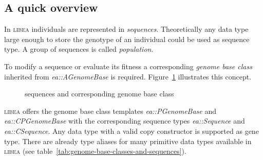 \documentclass[a4paper]{article}
\begin{document}
\subsection{A quick overview}

In \textsc{libea} individuals are represented in \textit{sequences}. Theoretically any data type large enough to store the genotype of an individual could be used as sequence type. A group of sequences is called \textit{population}.

To modify a sequence or evaluate its fitness a corresponding \textit{genome base class} inherited from \textit{ea::AGenomeBase} is required. Figure~\ref{fig:overview} illustrates this concept.

\begin{figure}[h]
\caption{sequences and corresponding genome base class}
\label{fig:overview}
{

}
\end{figure}

\textsc{libea} offers the genome base class templates \textit{ea::PGenomeBase} and \textit{ea::CPGenomeBase} with the corresponding sequence types \textit{ea::Sequence} and \textit{ea::CSequence}. Any data type with a valid copy constructor is supported as gene type. There are already type aliases for many primitive data types available in \textsc{libea} (see table~\ref{tab:genome-base-classes-and-sequences}).
\end{document}
